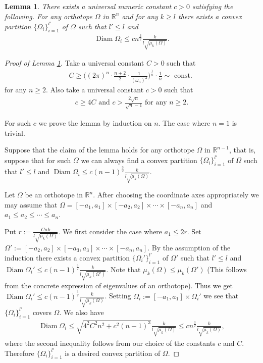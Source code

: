 \documentclass[10pt,a4paper]{amsart}
\newtheorem{lem}{Lemma}
\newcommand{\diam}{\operatorname{Diam}}
\begin{document}
\begin{lem}\label{Mlem1}There exists a universal numeric constant $c>0$ satisfying the following. For any orthotope $\Omega$ in $\mathbb{R}^n$ and for any $k\geq l$ there exists a convex partition $\{\Omega_i\}_{i=1}^{l'}$ of $\Omega$ such that $l'\leq l$ and 
    \begin{align*}
        \diam \Omega_i \leq cn^{\frac{3}{2}}\frac{k}{l\sqrt{\mu_k(\Omega)}}.
    \end{align*}
\end{lem}

\begin{proof}[Proof of Lemma \ref{Mlem1}]
    Take a universal constant $C>0$ such that 
    \begin{align*}
         C\geq \Big((2\pi)^n\cdot \frac{n+2}{2} \cdot \frac{1}{(\omega_n)^2}\Big)^{\frac{1}{n}}\cdot \frac{1}{n}\sim \text{ const. }
    \end{align*}for any $n\geq 2$. Also take a universal constant $c>0$ such that
    \begin{align*}
        c\geq 4C \text{ and }c>\frac{2\sqrt{n}}{\sqrt{n}-1} \text{ for any }n\geq 2.
    \end{align*}

    
    For such $c$ we prove the lemma by induction on $n$. The case where $n=1$ is trivial. 

    Suppose that the claim of the lemma holds for any orthotope $\Omega$ in $\mathbb{R}^{n-1}$, that is, suppose that for such $\Omega$ we can always find a convex partition $\{\Omega_i\}_{i=1}^{l'}$ of $\Omega$ such that $l'\leq l$ and $\diam \Omega_i\leq c(n-1)^{\frac{3}{2}}\frac{k}{l\sqrt{\mu_k(\Omega)}}$.

    Let $\Omega$ be an orthotope in $\mathbb{R}^n$. After choosing the coordinate axes appropriately we may assume that $\Omega=[-a_1,a_1]\times [-a_2,a_2]\times \cdots \times [-a_n,a_n]$ and $a_1\leq a_2\leq \cdots \leq a_n$.


    
    Put $r:=\frac{Cnk}{l\sqrt{\mu_k(\Omega)}}$. We first consider the case where $a_1\leq 2r$. Set $\Omega':=[-a_2,a_2]\times [-a_3,a_3]\times \cdots \times [-a_n,a_n]$. By the assumption of the induction there exists a convex partition $\{\Omega_i'\}_{i=1}^{l'}$ of $\Omega'$ such that $l'\leq l$ and $\diam \Omega_i'\leq c(n-1)^{\frac{3}{2}}\frac{k}{l\sqrt{\mu_k(\Omega')}}$. Note that $\mu_k(\Omega)\leq \mu_k(\Omega')$ (This follows from the concrete expression of eigenvalues of an orthotope). Thus we get $\diam \Omega_i'\leq c(n-1)^{\frac{3}{2}}\frac{k}{l\sqrt{\mu_k(\Omega)}}$. Setting $\Omega_i:=[-a_1,a_1]\times \Omega_i'$ we see that $\{\Omega_i\}_{i=1}^{l'}$ covers $\Omega$. We also have 
    \begin{align*}
        \diam \Omega_i\leq \sqrt{4^2C^2n^2+c^2(n-1)^3}\frac{k}{l\sqrt{\mu_k(\Omega)}}\leq cn^{\frac{3}{2}}\frac{k}{l\sqrt{\mu_k(\Omega)}},
    \end{align*}where the second inequality follows from our choice of the constants $c$ and $C$. Therefore $\{\Omega_i\}_{i=1}^{l'}$ is a desired convex partition of $\Omega$.
    


\end{proof}
\end{document}
